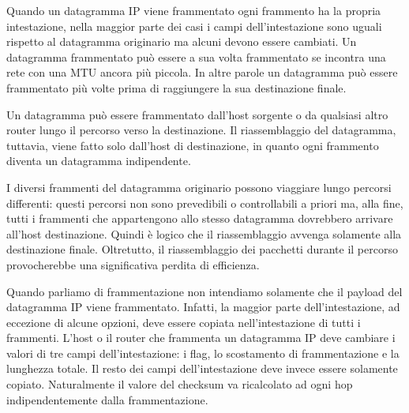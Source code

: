 Quando un datagramma IP viene frammentato ogni frammento ha la propria intestazione, nella maggior parte dei casi i campi dell'intestazione sono uguali rispetto al datagramma originario ma alcuni devono essere cambiati. Un datagramma frammentato può essere a sua volta frammentato se incontra una rete con una MTU ancora più piccola. In altre parole un datagramma può essere frammentato più volte prima di raggiungere la sua destinazione finale.

Un datagramma può essere frammentato dall'host sorgente o da qualsiasi altro router lungo il percorso verso la destinazione. Il riassemblaggio del datagramma, tuttavia, viene fatto solo dall'host di destinazione, in quanto ogni frammento diventa un datagramma indipendente.

I diversi frammenti del datagramma originario possono viaggiare lungo percorsi differenti: questi percorsi non sono prevedibili o controllabili a priori ma, alla fine, tutti i frammenti che appartengono allo stesso datagramma dovrebbero arrivare all'host destinazione. Quindi è logico che il riassemblaggio avvenga solamente alla destinazione finale. Oltretutto, il riassemblaggio dei pacchetti durante il percorso provocherebbe una significativa perdita di efficienza.

Quando parliamo di frammentazione non intendiamo solamente che il payload del datagramma IP viene frammentato. Infatti, la maggior parte dell'intestazione, ad eccezione di alcune opzioni, deve essere copiata nell'intestazione di tutti i frammenti. L'host o il router che frammenta un datagramma IP deve cambiare i valori di tre campi dell'intestazione: i flag, lo scostamento di frammentazione e la lunghezza totale. Il resto dei campi dell'intestazione deve invece essere solamente copiato. Naturalmente il valore del checksum va ricalcolato ad ogni hop indipendentemente dalla frammentazione.

